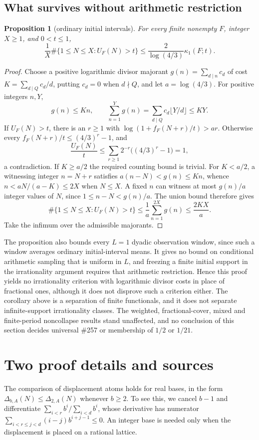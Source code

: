 \documentclass[11pt]{article}
\theoremstyle{plain}
\newtheorem{prop}[thm]{Proposition}
\theoremstyle{definition}
\theoremstyle{remark}
\begin{document}
\subsection{What survives without arithmetic restriction}
\begin{prop}[ordinary initial intervals]\label{prop:257-logarithmic-initial-interval}
For every finite nonempty $F$, integer $X\ge1$, and $0<t\le1$,
\[
 \frac1X\#\{1\le N\le X:U_F(N)>t\}
 \le\frac{2}{\log(4/3)}\kappa_1(F;t).
\]
\end{prop}
\begin{proof}
Choose a positive logarithmic divisor majorant
$g(n)=\sum_{d\mid n}c_d$ of cost $K=\sum_{d\mid Q}c_d/d$, putting
$c_d=0$ when $d\nmid Q$, and let $a=\log(4/3)$.
For positive integers $n,Y$,
\[
 g(n)\le Kn,\qquad
 \sum_{n=1}^{Y}g(n)=\sum_{d\mid Q}c_d\lfloor Y/d\rfloor\le KY.
\]
If $U_F(N)>t$, there is an $r\ge1$ with
$\log(1+f_F(N+r)/t)>ar$.
Otherwise every $f_F(N+r)/t\le(4/3)^r-1$, and
\[
 \frac{U_F(N)}t\le\sum_{r\ge1}2^{-r}\bigl((4/3)^r-1\bigr)=1,
\]
a contradiction.
If $K\ge a/2$ the required counting bound is trivial.
For $K<a/2$, a witnessing integer $n=N+r$ satisfies
$a(n-N)<g(n)\le Kn$, whence $n<aN/(a-K)\le2X$ when $N\le X$.
A fixed $n$ can witness at most $g(n)/a$ integer values of
$N$, since $1\le n-N<g(n)/a$.
The union bound therefore gives
\[
 \#\{1\le N\le X:U_F(N)>t\}
 \le\frac1a\sum_{n=1}^{2X}g(n)\le\frac{2KX}{a}.
\]
Take the infimum over the admissible majorants.
\end{proof}

The proposition also bounds every $L=1$ dyadic observation window, since
such a window averages ordinary initial-interval means.  It gives no bound
on conditional arithmetic sampling that is uniform in $L$, and freezing a finite
initial support in the irrationality argument requires that
arithmetic restriction.  Hence this proof yields no irrationality criterion with logarithmic
divisor costs in place of fractional ones, although it does not disprove such a criterion either.
The corollary above is a separation of finite functionals, and it does not
separate infinite-support irrationality classes.  The weighted, fractional-cover, mixed and
finite-period noncollapse results stand unaffected, and no conclusion of this section
decides universal \#257 or membership of $1/2$ or $1/21$.

\clearpage
\section*{Two proof details and sources}
The comparison of displacement atoms holds for real bases, in the form
$\Delta_{b,A}(N)\le\Delta_{2,A}(N)$ whenever $b\ge2$.
To see this, we cancel $b-1$ and differentiate
$\sum_{i<r}b^i/\sum_{i<d}b^i$, whose derivative has numerator
$\sum_{i<r\le j<d}(i-j)b^{i+j-1}\le0$.
An integer base is needed only when the displacement is placed on a
rational lattice.
\end{document}
